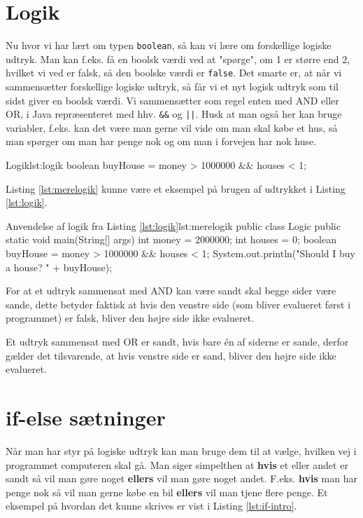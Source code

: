 
\section{Logik}
Nu hvor vi har lært om typen \texttt{boolean}, så kan vi lære om forskellige logiske udtryk. Man kan f.eks. få en boolsk værdi ved at "spørge", om 1 er større end 2, hvilket vi ved er falsk, så den boolske værdi er \texttt{false}. Det smarte er, at når vi sammensætter forskellige logiske udtryk, så får vi et nyt logisk udtryk som til sidst giver en boolsk værdi. Vi sammensætter som regel enten med AND eller OR, i Java repræsenteret med hhv. \texttt{\&\&} og \texttt{||}. Husk at man også her kan bruge variabler, f.eks. kan det være man gerne vil vide om man skal købe et hus, så man spørger om man har penge nok og om man i forvejen har nok huse. 

\begin{JavaCode}{Logik}{lst:logik}
	boolean buyHouse = money > 1000000 && houses < 1;
\end{JavaCode}

Listing \ref{lst:merelogik} kunne være et eksempel på brugen af udtrykket i Listing \ref{lst:logik}.

\begin{JavaCode}{Anvendelse af logik fra Listing \ref{lst:logik}}{lst:merelogik}
public class Logic {
	public static void main(String[] args) {
		int money = 2000000;
		int houses = 0;
		boolean buyHouse = money > 1000000 && houses < 1;
		System.out.println("Should I buy a house? " + buyHouse);
	}
}
\end{JavaCode}

\begin{remark}
	For at et udtryk sammensat med AND kan være sandt skal begge sider være sande, dette betyder faktisk at hvis den venstre side (som bliver evalueret først i programmet) er falsk, bliver den højre side ikke evalueret.
	
	Et udtryk sammensat med OR er sandt, hvis bare én af siderne er sande, derfor gælder det tilsvarende, at hvis venstre side er sand, bliver den højre side ikke evalueret.
\end{remark}

\section{if-else sætninger}
Når man har styr på logiske udtryk kan man bruge dem til at vælge, hvilken vej i programmet computeren skal gå. Man siger simpelthen at \textbf{hvis} et eller andet er sandt så vil man gøre noget \textbf{ellers} vil man gøre noget andet. F.eks. \textbf{hvis} man har penge nok så vil man gerne købe en bil \textbf{ellers} vil man tjene flere penge. Et eksempel på hvordan det kunne skrives er vist i Listing \ref{lst:if-intro}.

